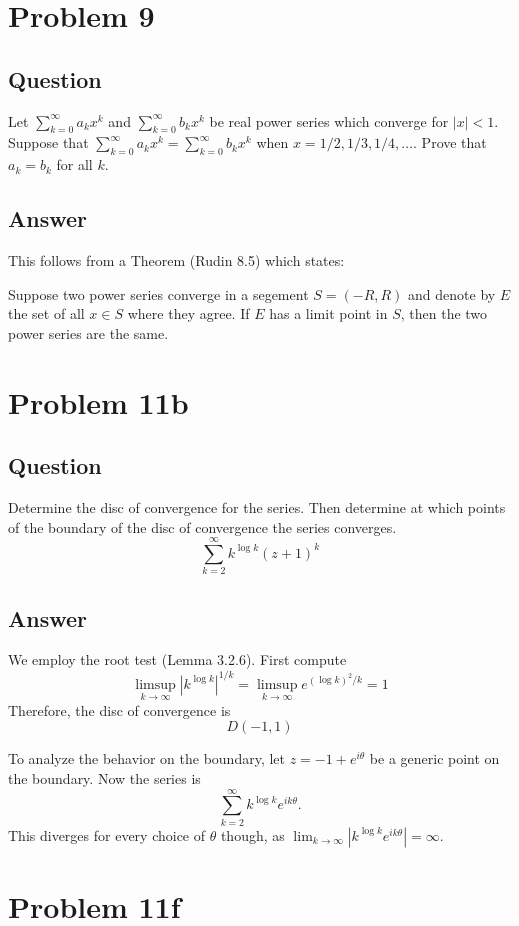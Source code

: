 \documentclass[11pt]{article}
\begin{document}
\section{Problem 9}
\subsection{Question}
Let $\sum_{k=0}^\infty a_k x^k$ and $\sum_{k=0}^\infty b_k x^k$ be real power series which converge for $|x| <1$. Suppose that $\sum_{k=0}^ \infty a_k x^k = \sum_{k=0}^ \infty b_k x^k$ when $ x = 1/2, 1/3, 1/4, \dots$. Prove that $a_k = b_k$ for all $k$.
\subsection{Answer}
This follows from a Theorem (Rudin 8.5) which states:

Suppose two power series converge in a segement $S = (-R,R)$ and  denote by $E$  the set of all $x \in S$ where they agree. If $E$ has a limit point in $S$, then the two power series are the same.

\section{Problem 11b}
\subsection{Question}
Determine the disc of convergence for the series. Then determine at which points of the boundary of the disc of convergence the series converges.
\[\sum_{k=2}^\infty k^{\log k} (z+1)^k\]
\subsection{Answer}
We employ the root test (Lemma 3.2.6). First compute
\[\limsup_{k \to \infty} |k^{\log k}| ^{1/k} = \limsup_{k \to \infty} e^{(\log k)^2 /k} =1\]
Therefore, the disc of convergence is 
\[D(-1 ,1 )\]

To analyze the behavior on the boundary, let $z = -1+e^{i \theta}$ be a generic point on the boundary. Now the series is
\[\sum_{k=2}^\infty k^{\log k} e^{i k \theta} .\]
This diverges for every choice of $\theta$ though, as $\lim_{k \to \infty} |k ^{\log k} e^{i k \theta}| = \infty$.


\section{Problem 11f}
\end{document}
